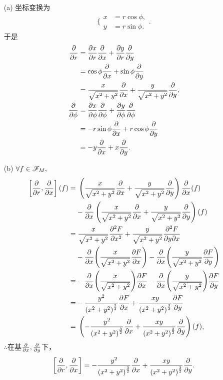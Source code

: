 \begin{xiti}
    \begin{jie}
    	\begin{enumerate}
    		\item[(a)] 坐标变换为
    		\begin{equation*}
    		\Bigg\{
    		\begin{aligned}
    		x&=r \cos \phi,\\
    		y&=r \sin \phi.
    		\end{aligned}
    		\Bigg.
    		\end{equation*}
    		于是
    		\begin{align*}
    		\allowdisplaybreaks
    		\pdv{r}&=\pdv{x}{r}\pdv{x}+\pdv{y}{r}\pdv{y}\\
    		&=\cos \phi \pdv{x}+\sin \phi \pdv{y}\\
    		&=\frac{x}{\sqrt{x^2+y^2}} \pdv{x}+\frac{y}{\sqrt{x^2+y^2}}\pdv{y},\\
    		\pdv{\phi}&=\pdv{x}{\phi}\pdv{\phi}+\pdv{y}{\phi}\pdv{\phi}\\
    		&=-r\sin \phi \pdv{x}+r\cos \phi \pdv{y}\\
    		&=-y\pdv{x}+x\pdv{y}.
    		\end{align*}
    		\item[(b)] $\forall f\in \mathscr{F}_M,$
    		\begin{align*}
    		\allowdisplaybreaks
    		\left[\pdv{r},\pdv{x}\right](f)=&\;\left(\frac{x}{\sqrt{x^2+y^2}}\pdv{x}+\frac{y}{\sqrt{x^2+y^2}}\pdv{y}\right)\pdv{x}(f)\\
    		&-\pdv{x}\left(\frac{x}{\sqrt{x^2+y^2}}\pdv{x}+\frac{y}{\sqrt{x^2+y^2}}\pdv{y}\right)(f)\\
    		=&\;\frac{x}{\sqrt{x^2+y^2}}\pdv[2]{F}{x}+\frac{y}{\sqrt{x^2+y^2}}\pdv{F}{y}{x}\\
    		&-\pdv{x}(\frac{x}{\sqrt{x^2+y^2}}\pdv{F}{x})-\pdv{x}(\frac{y}{\sqrt{x^2+y^2}}\pdv{F}{y})\\
    		=&-\pdv{x}(\frac{x}{\sqrt{x^2+y^2}})\pdv{F}{x}-\pdv{x}(\frac{y}{\sqrt{x^2+y^2}})\pdv{F}{y}\\
    		=&-\frac{y^2}{\left(x^2+y^2\right)^{\frac{3}{2}}}\pdv{F}{x}+\frac{x y}{\left(x^2+y^2\right)^\frac{3}{2}}\pdv{F}{y}\\
    		=&\;\left(-\frac{y^2}{\left(x^2+y^2\right)^\frac{3}{2}}\pdv{x}+\frac{x y}{\left(x^2+y^2\right)^\frac{3}{2}}\pdv{y}\right)(f),
    		\end{align*}
    		$\therefore $在基$\pdv{x},\pdv{y}$下，
    		\begin{equation*}
    		\left[\pdv{r},\pdv{x}\right]=-\frac{y^2}{\left(x^2+y^2\right)^\frac{3}{2}}\pdv{x}+\frac{x y}{\left(x^2+y^2\right)^\frac{3}{2}}\pdv{y}.

\end{equation*}
\end{enumerate}
\end{jie}
\end{xiti}
